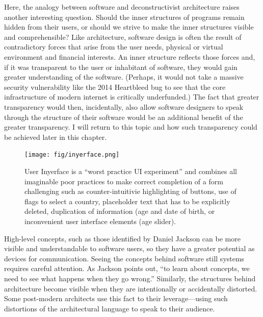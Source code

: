 Here, the analogy between software and deconstructivist architecture raises another interesting
question. Should the inner structures of programs remain hidden from their users, or should
we strive to make the inner structures visible and comprehensible?
Like architecture, software design is often the result of contradictory forces that
arise from the user needs, physical or virtual environment and financial interests.
An inner structure reflects those forces and, if it was transparent to the user or inhabitant
of software, they would gain greater understanding of the software. (Perhaps, it would not
take a massive security vulnerability like the 2014 Heartbleed bug to see that the core
infrastructure of modern internet is critically underfunded.)
The fact that greater transparency would then, incidentally, also allow software designers to
speak through the structure of their software would be an additional benefit of the greater
transparency. I will return to this topic and how such transparency could be achieved
later in this chapter.

\begin{figure}
\centering
\texttt{[image: fig/inyerface.png]}
\caption{User Inyerface is a ``worst practice UI experiment'' and combines all imaginable
poor practices to make correct completion of a form challenging such as counter-intuitivie
highlighting of buttons, use of flags to select a country, placeholder text that has to be
explicitly deleted, duplication of information (age and date of birth, or inconvenient user
interface elements (age slider).}
\label{fig:inyerface}
\end{figure}

High-level concepts, such as those identified by Daniel Jackson can be more visible and
understandable to software users, so they have a greater potential as devices for communication.
Seeing the concepts behind software still systems requires careful attention. As Jackson points
out, ``to learn about concepts, we need to see what happens when they go wrong.''
Similarly, the structures behind architecture become visible when they are intentionally or accidentally
distorted. Some post-modern architects use this fact to their leverage---using such
distortions of the architectural language to speak to their audience.

